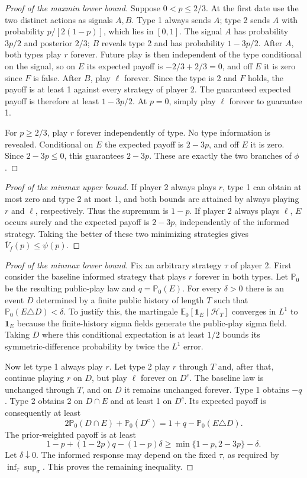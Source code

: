\documentclass[11pt,a4paper]{article}
\newcommand{\E}{\mathbb E}
\newcommand{\ind}{\mathbf 1}
\theoremstyle{definition}
\theoremstyle{remark}
\begin{document}
\begin{proof}[Proof of the maxmin lower bound]
Suppose $0<p\leq2/3$. At the first date use the two distinct actions as signals $A,B$. Type 1 always sends $A$; type 2 sends $A$ with probability $p/[2(1-p)]$, which lies in $[0,1]$. The signal $A$ has probability $3p/2$ and posterior $2/3$; $B$ reveals type 2 and has probability $1-3p/2$. After $A$, both types play $r$ forever. Future play is then independent of the type conditional on the signal, so on $E$ its expected payoff is $-2/3+2/3=0$, and off $E$ it is zero since $F$ is false. After $B$, play $\ell$ forever. Since the type is 2 and $F$ holds, the payoff is at least 1 against every strategy of player 2. The guaranteed expected payoff is therefore at least $1-3p/2$. At $p=0$, simply play $\ell$ forever to guarantee 1.

For $p\geq2/3$, play $r$ forever independently of type. No type information is revealed. Conditional on $E$ the expected payoff is $2-3p$, and off $E$ it is zero. Since $2-3p\leq0$, this guarantees $2-3p$. These are exactly the two branches of $\phi$.
\end{proof}

\begin{proof}[Proof of the minmax upper bound]
If player 2 always plays $r$, type 1 can obtain at most zero and type 2 at most 1, and both bounds are attained by always playing $r$ and $\ell$, respectively. Thus the supremum is $1-p$. If player 2 always plays $\ell$, $E$ occurs surely and the expected payoff is $2-3p$, independently of the informed strategy. Taking the better of these two minimizing strategies gives $\overline V_f(p)\leq\psi(p)$.
\end{proof}

\begin{proof}[Proof of the minmax lower bound]
Fix an arbitrary strategy $\tau$ of player 2. First consider the baseline informed strategy that plays $r$ forever in both types. Let $\mathbb P_0$ be the resulting public-play law and $q=\mathbb P_0(E)$. For every $\delta>0$ there is an event $D$ determined by a finite public history of length $T$ such that $\mathbb P_0(E\triangle D)<\delta$. To justify this, the martingale $\E_0[\ind_E\mid\mathcal H_T]$ converges in $L^1$ to $\ind_E$ because the finite-history sigma fields generate the public-play sigma field. Taking $D$ where this conditional expectation is at least $1/2$ bounds its symmetric-difference probability by twice the $L^1$ error.

Now let type 1 always play $r$. Let type 2 play $r$ through $T$ and, after that, continue playing $r$ on $D$, but play $\ell$ forever on $D^c$. The baseline law is unchanged through $T$, and on $D$ it remains unchanged forever. Type 1 obtains $-q$. Type 2 obtains 2 on $D\cap E$ and at least 1 on $D^c$. Its expected payoff is consequently at least
\[
 2\mathbb P_0(D\cap E)+\mathbb P_0(D^c)
 =1+q-\mathbb P_0(E\triangle D).
\]
The prior-weighted payoff is at least
\[
 1-p+(1-2p)q-(1-p)\delta
 \geq\min\{1-p,2-3p\}-\delta.
\]
Let $\delta\downarrow0$. The informed response may depend on the fixed $\tau$, as required by $\inf_\tau\sup_\sigma$. This proves the remaining inequality.
\end{proof}
\end{document}
